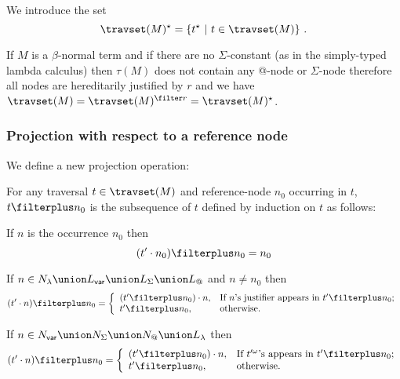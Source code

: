 We introduce the set
$$\travset(M)^\star = \{ t^\star \ | \  t \in \travset(M) \} \ .$$

\begin{remark}
If $M$ is a $\beta$-normal term and if there are no
$\Sigma$-constant (as in the simply-typed lambda calculus) then
$\tau(M)$ does not contain any @-node or $\Sigma$-node therefore all
nodes are hereditarily justified by $r$ and we have $\travset(M) =
\travset(M)^{\filter r} = \travset(M)^\star$.
\end{remark}


\subsubsection{Projection with respect to a reference node}
\label{sec:tstar}

We define a new projection operation:
\begin{definition}
 For any traversal $t\in \travset(M)$ and reference-node $n_0$ occurring in $t$, $t \filterplus n_0$
is the subsequence of $t$ defined by induction on $t$ as follows:
\begin{compactitem}
\item If $n$ is the occurrence $n_0$ then
$$(t' \cdot n_0) \filterplus n_0 = n_0$$
\item If $n\in N_\lambda \union L_{\sf var} \union L_\Sigma \union L_@$ and $n\neq n_0$ then
$$
(t' \cdot n) \filterplus n_0 = \left\{
                                  \begin{array}{ll}
                                    (t'\filterplus n_0) \cdot n, & \hbox{If $n$'s justifier appears in $t'\filterplus n_0$;} \\
                                    t'\filterplus n_0, & \hbox{otherwise.}
                                  \end{array}
                                \right.
$$
\item If $n \in N_{\sf var} \union N_\Sigma \union N_@ \union L_\lambda$ then
$$
(t' \cdot n) \filterplus n_0 = \left\{
                                  \begin{array}{ll}
                                    (t'\filterplus n_0) \cdot n, & \hbox{If $t'^\omega$'s appears in $t'\filterplus n_0$;} \\
                                    t'\filterplus n_0, & \hbox{otherwise.}
                                  \end{array}
                                \right.
$$
\end{compactitem}
\end{definition}

